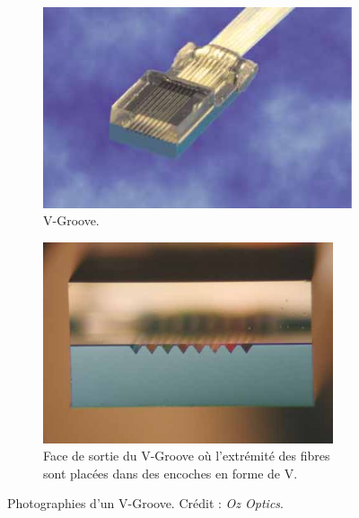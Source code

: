 \begin{figure}[ht!]
    \centering
    \begin{subfigure}[t]{0.4\textwidth}
        \centering
        \includegraphics[width=\textwidth]{Figure_Chap2/VGroove_PigtailArray.png}
        \caption{V-Groove.}
        \label{fig:VGrooveA}
    \end{subfigure}%
    \begin{subfigure}[t]{0.4\textwidth}
        \centering
        \includegraphics[width=0.94\textwidth]{Figure_Chap2/VGroove_EndFace.png}
        \caption{Face de sortie du V-Groove où l'extrémité des fibres sont placées dans des encoches en forme de V.}
        \label{fig:VGrooveB}
    \end{subfigure}
    \caption[Photographies d'un V-Groove.]{Photographies d'un V-Groove. Crédit : \textit{Oz Optics}.}
    \label{fig:VGroove}
\end{figure}

